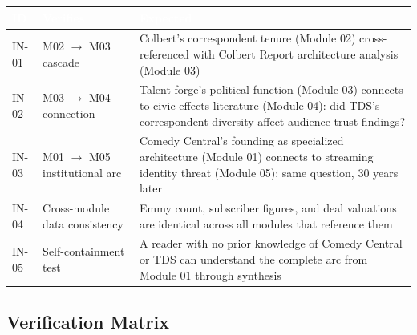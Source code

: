 \documentclass[11pt,letterpaper]{article}
\newcommand{\tableheader}[1]{\textbf{\sffamily\textcolor{white}{#1}}}
\begin{document}
\begin{center}
\begin{tabularx}{\textwidth}{C{1.5cm}L{5cm}X}
\toprule
{}
\tableheader{ID} & \tableheader{Verifies} & \tableheader{Expected} \\
\midrule
IN-01 & M02 $\rightarrow$ M03 cascade & Colbert's correspondent tenure (Module 02) cross-referenced with Colbert Report architecture analysis (Module 03) \\
IN-02 & M03 $\rightarrow$ M04 connection & Talent forge's political function (Module 03) connects to civic effects literature (Module 04): did TDS's correspondent diversity affect audience trust findings? \\
IN-03 & M01 $\rightarrow$ M05 institutional arc & Comedy Central's founding as specialized architecture (Module 01) connects to streaming identity threat (Module 05): same question, 30 years later \\
IN-04 & Cross-module data consistency & Emmy count, subscriber figures, and deal valuations are identical across all modules that reference them \\
IN-05 & Self-containment test & A reader with no prior knowledge of Comedy Central or TDS can understand the complete arc from Module 01 through synthesis \\
\bottomrule
\end{tabularx}
\end{center}

\subsection{Verification Matrix}
\end{document}
